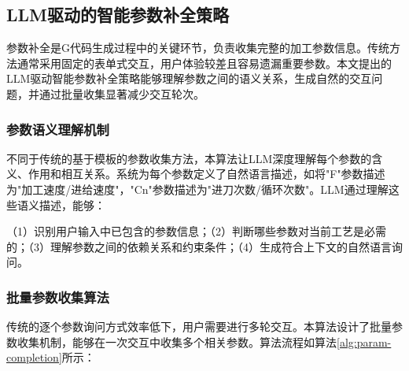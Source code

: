 \documentclass[preprint,12pt]{elsarticle}
\begin{document}
\subsection{LLM驱动的智能参数补全策略}

参数补全是G代码生成过程中的关键环节，负责收集完整的加工参数信息。传统方法通常采用固定的表单式交互，用户体验较差且容易遗漏重要参数。本文提出的LLM驱动智能参数补全策略能够理解参数之间的语义关系，生成自然的交互问题，并通过批量收集显著减少交互轮次。

\subsubsection{参数语义理解机制}

不同于传统的基于模板的参数收集方法，本算法让LLM深度理解每个参数的含义、作用和相互关系。系统为每个参数定义了自然语言描述，如将"F"参数描述为"加工速度/进给速度"，"Cn"参数描述为"进刀次数/循环次数"。LLM通过理解这些语义描述，能够：

（1）识别用户输入中已包含的参数信息；（2）判断哪些参数对当前工艺是必需的；（3）理解参数之间的依赖关系和约束条件；（4）生成符合上下文的自然语言询问。

\subsubsection{批量参数收集算法}

传统的逐个参数询问方式效率低下，用户需要进行多轮交互。本算法设计了批量参数收集机制，能够在一次交互中收集多个相关参数。算法流程如算法\ref{alg:param-completion}所示：
\end{document}
